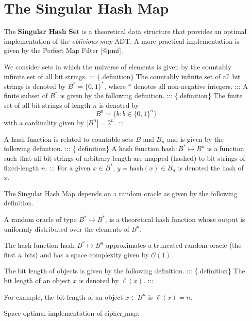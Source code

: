 \documentclass[
  letterpaper,
  DIV=11,
  numbers=noendperiod]{scrartcl}
\theoremstyle{remark}
\begin{document}
\section{\texorpdfstring{The \textbf{Singular Hash
Map}}{The Singular Hash Map}}\label{the-singular-hash-map}

The \textbf{Singular Hash Set} is a theoretical data structure that
provides an optimal implementation of the \emph{oblivious map} ADT. A
more practical implementation is given by the Perfect Map Filter
{[}@pmf{]}.

We consider sets in which the universe of elements is given by the
countably infinite set of all bit strings. ::: \{.definition\} The
countably infinite set of all bit strings is denoted by
\(B^* = \{0,1\}^*\), where \(*\) denotes all non-negative integers. :::
A finite subset of \(B^*\) is given by the following definition. :::
\{.definition\} The finite set of all bit strings of length \(n\) is
denoted by \begin{equation}
    B^n = \bigl\{b \colon b \in \{0,1\}^n\bigr\}
\end{equation} with a cardinality given by \(|B^n| = 2^n\). :::

A hash function is related to countable sets \(B\) and \(B_n\) and is
given by the following definition. ::: \{.definition\} A hash function
\(\mathrm{hash} : B^* \mapsto B^n\) is a function such that all bit
strings of arbitrary-length are mapped (hashed) to bit strings of
fixed-length \(n\). ::: For a given \(x \in B^*\),
\(y = \mathrm{hash}(x) \in B_n\) is denoted the hash of \(x\).

The Singular Hash Map depends on a random oracle as given by the
following definition.

\label{def:randomoracle}
A random oracle of type \(B^* \mapsto B^*\), is a theoretical hash
function whose output is uniformly distributed over the elements of
\(B^n\).

The hash function \(\mathrm{hash} : B^* \mapsto B^n\) approximates a
truncated random oracle (the first \(n\) bits) and has a space
complexity given by \(\mathcal{O}(1)\).

The bit length of objects is given by the following definition. :::
\{.definition\} The bit length of an object \(x\) is denoted by
\(\ell(x)\). :::

For example, the bit length of an object \(x \in B^n\) is
\(\ell(x) = n\).

Space-optimal implementation of \(\mathrm{cipher\_map}\).
\end{document}
